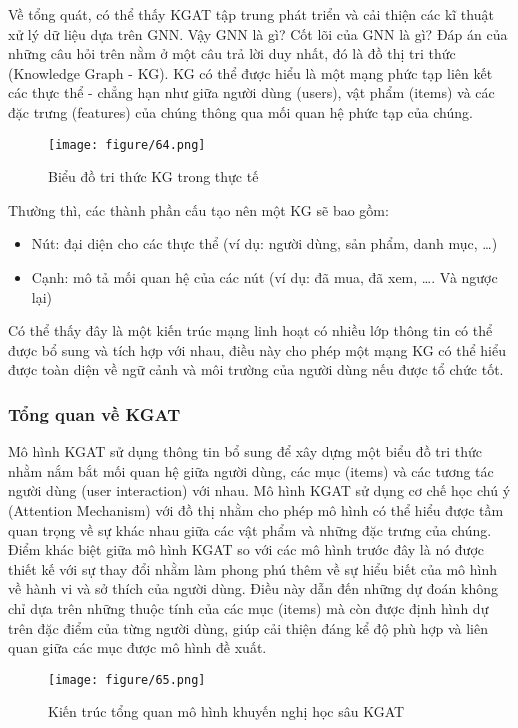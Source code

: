 Về tổng quát, có thể thấy KGAT tập trung phát triển và cải thiện các kĩ thuật xử lý dữ liệu dựa trên GNN. Vậy GNN là gì? Cốt lõi của GNN là gì? Đáp án của những câu hỏi trên nằm ở một câu trả lời duy nhất, đó là đồ thị tri thức (Knowledge Graph - KG). KG có thể được hiểu là một mạng phức tạp liên kết các thực thể - chẳng hạn như giữa người dùng (users), vật phẩm (items) và các đặc trưng (features) của chúng thông qua mối quan hệ phức tạp của chúng.

\begin{figure}[h]
    \centering
    \texttt{[image: figure/64.png]}
    \caption{Biểu đồ tri thức KG trong thực tế}
    \label{fig:kg_example}
\end{figure}

Thường thì, các thành phần cấu tạo nên một KG sẽ bao gồm:
\begin{itemize}
    \item Nút: đại diện cho các thực thể (ví dụ: người dùng, sản phẩm, danh mục, …)
    \item Cạnh: mô tả mối quan hệ của các nút (ví dụ: đã mua, đã xem, …. Và ngược lại)
\end{itemize}

Có thể thấy đây là một kiến trúc mạng linh hoạt có nhiều lớp thông tin có thể được bổ sung và tích hợp với nhau, điều này cho phép một mạng KG có thể hiểu được toàn diện về ngữ cảnh và môi trường của người dùng nếu được tổ chức tốt.

\subsubsection{Tổng quan về KGAT}
Mô hình KGAT sử dụng thông tin bổ sung để xây dựng một biểu đồ tri thức nhằm nắm bắt mối quan hệ giữa người dùng, các mục (items) và các tương tác người dùng (user interaction) với nhau. Mô hình KGAT sử dụng cơ chế học chú ý (Attention Mechanism) với đồ thị nhằm cho phép mô hình có thể hiểu được tầm quan trọng về sự khác nhau giữa các vật phẩm và những đặc trưng của chúng. Điểm khác biệt giữa mô hình KGAT so với các mô hình trước đây là nó được thiết kế với sự thay đổi nhằm làm phong phú thêm về sự hiểu biết của mô hình về hành vi và sở thích của người dùng. Điều này dẫn đến những dự đoán không chỉ dựa trên những thuộc tính của các mục (items) mà còn được định hình dự trên đặc điểm của từng người dùng, giúp cải thiện đáng kể độ phù hợp và liên quan giữa các mục được mô hình đề xuất. 

\begin{figure}[h]
    \centering
    \texttt{[image: figure/65.png]}
    \caption{Kiến trúc tổng quan mô hình khuyến nghị học sâu KGAT}
    \label{fig:kgat_model}
\end{figure}

